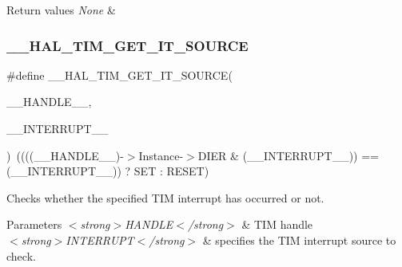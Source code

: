 \begin{DoxyRetVals}{Return values}
{\em None} & \\
\hline
\end{DoxyRetVals}
\mbox{\label{group___t_i_m___exported___macros_ga644babf93470a6eee6bce8906c4da5c5}} 
\subsubsection{\texorpdfstring{\+\_\+\+\_\+\+H\+A\+L\+\_\+\+T\+I\+M\+\_\+\+G\+E\+T\+\_\+\+I\+T\+\_\+\+S\+O\+U\+R\+CE}{\_\_HAL\_TIM\_GET\_IT\_SOURCE}}
{\footnotesize\ttfamily \#define \+\_\+\+\_\+\+H\+A\+L\+\_\+\+T\+I\+M\+\_\+\+G\+E\+T\+\_\+\+I\+T\+\_\+\+S\+O\+U\+R\+CE(\begin{DoxyParamCaption}\item[{}]{\+\_\+\+\_\+\+H\+A\+N\+D\+L\+E\+\_\+\+\_\+,  }\item[{}]{\+\_\+\+\_\+\+I\+N\+T\+E\+R\+R\+U\+P\+T\+\_\+\+\_\+ }\end{DoxyParamCaption})~((((\+\_\+\+\_\+\+H\+A\+N\+D\+L\+E\+\_\+\+\_\+)-\/$>$Instance-\/$>$D\+I\+ER \& (\+\_\+\+\_\+\+I\+N\+T\+E\+R\+R\+U\+P\+T\+\_\+\+\_\+)) == (\+\_\+\+\_\+\+I\+N\+T\+E\+R\+R\+U\+P\+T\+\_\+\+\_\+)) ? S\+ET \+: R\+E\+S\+ET)}



Checks whether the specified T\+IM interrupt has occurred or not. 


\begin{DoxyParams}{Parameters}
{\em $<$strong$>$\+H\+A\+N\+D\+L\+E$<$/strong$>$} & T\+IM handle \\
\hline
{\em $<$strong$>$\+I\+N\+T\+E\+R\+R\+U\+P\+T$<$/strong$>$} & specifies the T\+IM interrupt source to check. \\
\hline
\end{DoxyParams}

